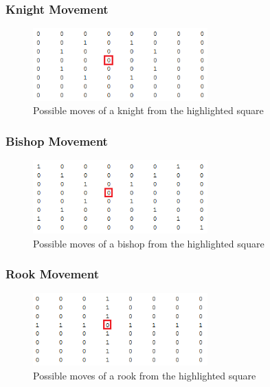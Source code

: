 \documentclass[11pt,a4paper]{article}
\begin{document}
\subsubsection{Knight Movement}
\begin{figure}[H]
\centering
\includegraphics[width=0.6\textwidth]{knight_movement}
\caption{Possible moves of a knight from the highlighted square}
\label{fig:chess1}
\end{figure}

\subsubsection{Bishop Movement}
\begin{figure}[H]
\centering
\includegraphics[width=0.6\textwidth]{bishop_movement}
\caption{Possible moves of a bishop from the highlighted square}
\label{fig:chess1}
\end{figure}

\subsubsection{Rook Movement}
\begin{figure}[H]
\centering
\includegraphics[width=0.6\textwidth]{rook_movement}
\caption{Possible moves of a rook from the highlighted square}
\label{fig:chess1}
\end{figure}
\end{document}
